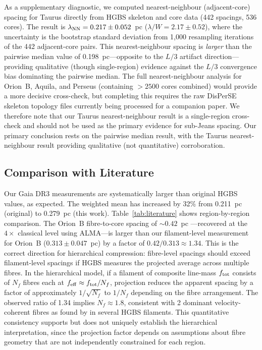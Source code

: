 \documentclass[twoside,twocolumn]{mnras}
\begin{document}
As a supplementary diagnostic, we computed nearest-neighbour (adjacent-core) spacing
for Taurus directly from HGBS skeleton and core data (442 spacings, 536 cores).
The result is $\lambda_{\rm NN} = 0.217 \pm 0.052$~pc ($\lambda/W = 2.17 \pm 0.52$),
where the uncertainty is the bootstrap standard deviation from 1,000 resampling
iterations of the 442 adjacent-core pairs. This nearest-neighbour spacing is
\textit{larger} than the pairwise median value of 0.198~pc---opposite to the
$L/3$ artifact direction---providing qualitative (though single-region) evidence
against the $L/3$ convergence bias dominating the pairwise median.
The full nearest-neighbour analysis for Orion~B, Aquila, and Perseus (containing
$>2500$ cores combined) would provide a more decisive cross-check, but completing
this requires the raw DisPerSE skeleton topology files currently being processed for
a companion paper. We therefore note that our Taurus nearest-neighbour result is a
single-region cross-check and should not be used as the primary evidence for sub-Jeans
spacing. Our primary conclusion rests on the pairwise median result, with the Taurus
nearest-neighbour result providing qualitative (not quantitative) corroboration.

\subsection{Comparison with Literature}

Our Gaia DR3 measurements are systematically larger than original HGBS values, as
expected. The weighted mean has increased by 32\% from 0.211~pc (original) to
0.279~pc (this work). Table~\ref{tab:literature} shows region-by-region comparison.
The Orion~B fibre-to-core spacing of ${\sim}0.42$~pc \citep{Yang2024}---recovered at the
$4\times$ classical level using ALMA---is larger than our filament-level measurement for
Orion~B ($0.313 \pm 0.047$~pc) by a factor of $0.42/0.313 \approx 1.34$. This is the
correct direction for hierarchical compression: fibre-level spacings should exceed
filament-level spacings if HGBS measures the projected average across multiple fibres.
In the hierarchical model, if a filament of composite line-mass $f_{\rm tot}$ consists
of $N_f$ fibres each at $f_{\rm eff} \approx f_{\rm tot}/N_f$, projection reduces the
apparent spacing by a factor of approximately $1/\sqrt{N_f}$ to $1/N_f$ depending on
the fibre arrangement. The observed ratio of 1.34 implies $N_f \approx 1.8$, consistent
with 2 dominant velocity-coherent fibres as found by \citet{Hacar2018} in several HGBS
filaments. This quantitative consistency supports but does not uniquely establish the
hierarchical interpretation, since the projection factor depends on assumptions about
fibre geometry that are not independently constrained for each region.
\end{document}
